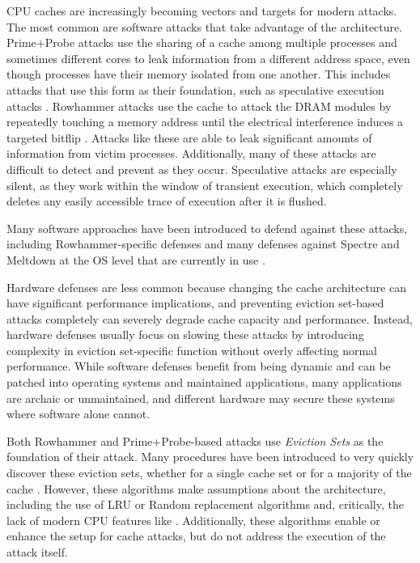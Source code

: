 \documentclass[sigconf, screen, review]{acmart}
\begin{document}
CPU caches are increasingly becoming vectors and targets for modern attacks.
The most common are software attacks that take advantage of the architecture.
Prime+Probe attacks use the sharing of a cache among multiple processes and sometimes different cores
to leak information from a different address space,
even though processes have their memory isolated from one another.
This includes attacks that use this form as their foundation,
such as speculative execution attacks
\cite{Gofetch}\cite{Spectre}\cite{TikTag}\cite{PACMan}\cite{SPAM}\cite{LeakyWay}\cite{Streamline}\cite{TransientAttackSurvey}.
Rowhammer attacks use the cache to attack the DRAM modules
by repeatedly touching a memory address until the electrical interference induces a targeted bitflip
\cite{Rowhammer}.
Attacks like these are able to leak significant amounts of information from victim processes.
Additionally, many of these attacks are difficult to detect and prevent as they occur.
Speculative attacks are especially silent,
as they work within the window of transient execution,
which completely deletes any easily accessible trace of execution after it is flushed.

Many software approaches have been introduced to defend against these attacks,
including Rowhammer-specific defenses
\cite{RowhammerDefense} %
and many defenses against Spectre and Meltdown at the OS level that are currently in use
.

Hardware defenses are less common because changing the cache architecture can have
significant performance implications,
and preventing eviction set-based attacks completely can severely degrade
cache capacity and performance.
Instead, hardware defenses usually focus on slowing these attacks
by introducing complexity in eviction set-specific function
without overly affecting normal performance.
While software defenses benefit from being dynamic
and can be patched into operating systems and maintained applications,
many applications are archaic or unmaintained, and different hardware may secure these systems
where software alone cannot.

Both Rowhammer and Prime+Probe-based attacks use \textit{Eviction Sets}
as the foundation of their attack.
Many procedures have been introduced to very quickly discover these eviction sets,
whether for a single cache set \cite{TPFES}
or for a majority of the cache \cite{EvictionSetsAtScale}.
However, these algorithms make assumptions about the architecture,
including the use of LRU or Random replacement algorithms
and, critically, the lack of modern CPU features like 
\cite{EvictionSetsAtScale}.
Additionally, these algorithms enable or enhance the setup for cache attacks,
but do not address the execution of the attack itself.
\end{document}
